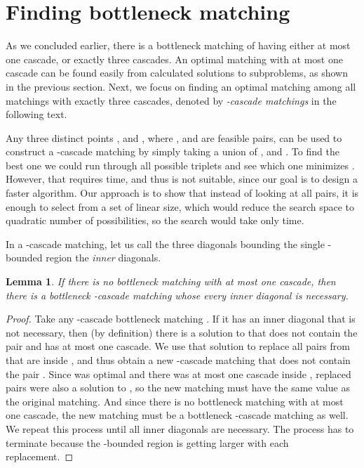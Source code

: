 \documentclass[a4paper, 11pt]{article}
\newtheorem{lemma}[theorem]{Lemma}
\begin{document}
\section{Finding bottleneck matching}
\label{sec:FindingBottleneckMatching}

As we concluded earlier, there is a bottleneck matching of  having either at most one cascade, or exactly three cascades. An optimal matching with at most one cascade can be found easily from calculated solutions to subproblems, as shown in the previous section. Next, we focus on finding an optimal matching among all matchings with exactly three cascades, denoted by \emph{-cascade matchings} in the following text.

Any three distinct points ,  and , where ,  and  are feasible pairs, can be used to construct a -cascade matching by simply taking a union of ,  and . To find the best one we could run through all possible triplets  and see which one minimizes . However, that requires  time, and thus is not suitable, since our goal is to design a faster algorithm. Our approach is to show that instead of looking at all  pairs, it is enough to select  from a set of linear size, which would reduce the search space to quadratic number of possibilities, so the search would take only  time.

In a -cascade matching, let us call the three diagonals bounding the single -bounded region the \emph{inner} diagonals.

\begin{lemma}
	\label{lem:BottleneckWithAllNecessary}
	If there is no bottleneck matching with at most one cascade, then there is a bottleneck -cascade matching whose every inner diagonal is necessary.
\end{lemma}
\begin{proof}
	Take any -cascade bottleneck matching . If it has an inner diagonal  that is not necessary, then (by definition) there is a solution to  that does not contain the pair  and has at most one cascade. We use that solution to replace all pairs from  that are inside , and thus obtain a new -cascade matching that does not contain the pair . Since  was optimal and there was at most one cascade inside , replaced pairs were also a solution to , so the new matching must have the same value as the original matching. And since there is no bottleneck matching with at most one cascade, the new matching must be a bottleneck -cascade matching as well. We repeat this process until all inner diagonals are necessary. The process has to terminate because the -bounded region is getting larger with each replacement.
\end{proof}
\end{document}
